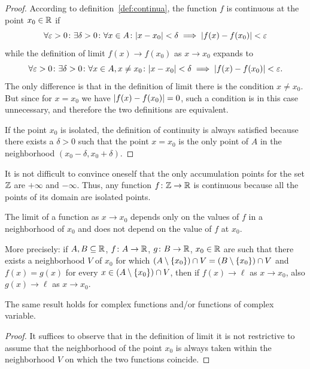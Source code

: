   \begin{proof}
  According to definition~\ref{def:continua}, the function $f$ is continuous at
  the point $x_0\in {\mathbb R}$ if
  \[
   \forall \varepsilon>0 \colon \exists \delta >0 \colon
   \forall x \in A\colon
   {\left|x-x_0\right|}<\delta \implies {\left|f(x)-f(x_0)\right|} < \varepsilon
  \]
  while the definition of limit $f(x)\to f(x_0)$ as $x\to x_0$
  expands to
  \[
  \forall \varepsilon>0 \colon \exists \delta>0\colon
  \forall x \in A, x\neq x_0\colon
  {\left|x-x_0\right|}<\delta \implies {\left|f(x)-f(x_0)\right|} < \varepsilon.
  \]
  The only difference is that in the definition of limit
  there is the condition $x\neq x_0$. But since for $x=x_0$
  we have ${\left|f(x)-f(x_0)\right|}=0$, such a condition is in this case 
  unnecessary, and therefore the two definitions are equivalent.

  If the point $x_0$ is isolated, the definition of continuity
  is always satisfied because there exists a $\delta>0$ 
  such that the point $x=x_0$ is the only point of $A$ 
  in the neighborhood $(x_0-\delta,x_0+\delta)$.
  \end{proof}

\begin{example}
  It is not difficult to convince oneself that the only accumulation points 
  for the set ${\mathbb Z}$ are $+\infty$ and $-\infty$.
  Thus, any function $f\colon {\mathbb Z} \to {\mathbb R}$ is continuous because 
  all the points of its domain are isolated points.
\end{example}
  
\begin{theorem}%
\label{th:localita_limite}%
The limit of a function as $x\to x_0$ depends only on the values of $f$
in a neighborhood of $x_0$ and does not depend on the value of $f$ at $x_0$.

More precisely: if $A,B\subseteq {\mathbb R}$, $f\colon A\to {\mathbb R}$, $g\colon B\to {\mathbb R}$, 
$x_0\in {\mathbb R}$ are such that 
there exists a neighborhood $V$ of $x_0$ for which 
$(A\setminus{\left\{ x_0 \right\}}) \cap  V = (B\setminus {\left\{ x_0 \right\}}) \cap V$ 
and $f(x)=g(x)$ for every $x\in(A\setminus{\left\{ x_0 \right\}}) \cap  V$, 
then if $f(x)\to \ell$ as $x\to x_0$, also $g(x)\to \ell$ 
as $x\to x_0$.

The same result holds for complex functions and/or functions of complex
variable.
\end{theorem}
%
\begin{proof}
  It suffices to observe that in the definition of limit 
  it is not restrictive to assume that the neighborhood of the point $x_0$ 
  is always taken within the neighborhood $V$ on which 
  the two functions coincide.
\end{proof}

